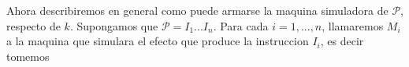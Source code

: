 \begin{frame}
  Ahora describiremos en general como puede armarse la maquina
  simuladora de $\mathcal{P}$, respecto de $k$. Supongamos que $\mathcal{P}%
  =I_{1}...I_{n}$. Para cada $i=1,...,n$, llamaremos $M_{i}$ a la maquina que
  simulara el efecto que produce la instruccion $I_{i}$, es decir tomemos
\end{frame}
